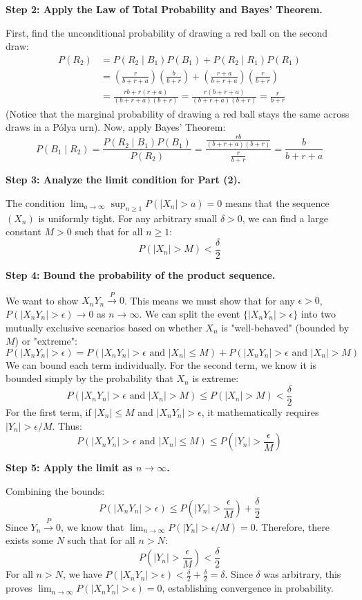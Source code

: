 \begin{solution}
\textbf{Step 2: Apply the Law of Total Probability and Bayes' Theorem.}

First, find the unconditional probability of drawing a red ball on the second draw:
\begin{align*}
P(R_2) &= P(R_2 \mid B_1) P(B_1) + P(R_2 \mid R_1) P(R_1) \\
&= \left( \frac{r}{b+r+a} \right) \left( \frac{b}{b+r} \right) + \left( \frac{r+a}{b+r+a} \right) \left( \frac{r}{b+r} \right) \\
&= \frac{rb + r(r+a)}{(b+r+a)(b+r)} = \frac{r(b+r+a)}{(b+r+a)(b+r)} = \frac{r}{b+r}
\end{align*}
(Notice that the marginal probability of drawing a red ball stays the same across draws in a Pólya urn).
Now, apply Bayes' Theorem:
\[ P(B_1 \mid R_2) = \frac{P(R_2 \mid B_1) P(B_1)}{P(R_2)} = \frac{ \frac{rb}{(b+r+a)(b+r)} }{ \frac{r}{b+r} } = \frac{b}{b+r+a} \]

\textbf{Step 3: Analyze the limit condition for Part (2).}

The condition $\lim_{a \to \infty} \sup_{n \geq 1} P(|X_n| > a) = 0$ means that the sequence $(X_n)$ is uniformly tight. For any arbitrary small $\delta > 0$, we can find a large constant $M > 0$ such that for all $n \geq 1$:
\[ P(|X_n| > M) < \frac{\delta}{2} \]

\textbf{Step 4: Bound the probability of the product sequence.}

We want to show $X_n Y_n \xrightarrow{P} 0$. This means we must show that for any $\epsilon > 0$, $P(|X_n Y_n| > \epsilon) \to 0$ as $n \to \infty$.
We can split the event $\{|X_n Y_n| > \epsilon\}$ into two mutually exclusive scenarios based on whether $X_n$ is "well-behaved" (bounded by $M$) or "extreme":
\[ P(|X_n Y_n| > \epsilon) = P(|X_n Y_n| > \epsilon \text{ and } |X_n| \leq M) + P(|X_n Y_n| > \epsilon \text{ and } |X_n| > M) \]
We can bound each term individually.
For the second term, we know it is bounded simply by the probability that $X_n$ is extreme:
\[ P(|X_n Y_n| > \epsilon \text{ and } |X_n| > M) \leq P(|X_n| > M) < \frac{\delta}{2} \]
For the first term, if $|X_n| \leq M$ and $|X_n Y_n| > \epsilon$, it mathematically requires $|Y_n| > \epsilon / M$. Thus:
\[ P(|X_n Y_n| > \epsilon \text{ and } |X_n| \leq M) \leq P\left(|Y_n| > \frac{\epsilon}{M}\right) \]

\textbf{Step 5: Apply the limit as $n \to \infty$.}

Combining the bounds:
\[ P(|X_n Y_n| > \epsilon) \leq P\left(|Y_n| > \frac{\epsilon}{M}\right) + \frac{\delta}{2} \]
Since $Y_n \xrightarrow{P} 0$, we know that $\lim_{n \to \infty} P(|Y_n| > \epsilon / M) = 0$.
Therefore, there exists some $N$ such that for all $n > N$:
\[ P\left(|Y_n| > \frac{\epsilon}{M}\right) < \frac{\delta}{2} \]
For all $n > N$, we have $P(|X_n Y_n| > \epsilon) < \frac{\delta}{2} + \frac{\delta}{2} = \delta$.
Since $\delta$ was arbitrary, this proves $\lim_{n \to \infty} P(|X_n Y_n| > \epsilon) = 0$, establishing convergence in probability.
\end{solution}

